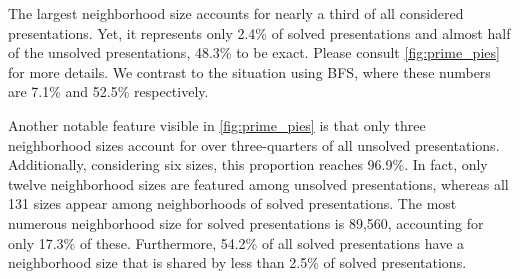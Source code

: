 The largest neighborhood size accounts for nearly a third of all considered presentations.
Yet, it represents only 2.4\% of solved presentations and almost half of the unsolved presentations, 48.3\% to be exact.
Please consult \autoref{fig:prime_pies} for more details.
We contrast to the situation using BFS, where these numbers are 7.1\% and 52.5\% respectively.

Another notable feature visible in \autoref{fig:prime_pies} is that only three neighborhood sizes account for over three-quarters of all unsolved presentations.
Additionally, considering six sizes, this proportion reaches 96.9\%.
In fact, only twelve neighborhood sizes are featured among unsolved presentations, whereas all 131 sizes appear among neighborhoods of solved presentations.
The most numerous neighborhood size for solved presentations is 89,560, accounting for only 17.3\% of these.
Furthermore, 54.2\% of all solved presentations have a neighborhood size that is shared by less than 2.5\% of solved presentations.

